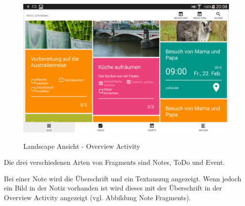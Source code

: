 \begin{figure}[H]
\centering
\begin{minipage}[t]{1\textwidth} %
\caption{Landscape Ansicht - Overview Activity} %
\includegraphics[width=1\textwidth]{img/Landscape}\\ %
\end{minipage}
\end{figure}

Die drei verschiedenen Arten von Fragments sind Notes, ToDo und Event.

Bei einer Note wird die Überschrift und ein Textauszug angezeigt. Wenn jedoch ein Bild in der Notiz vorhanden ist wird dieses mit der Überschrift in der Overview Activity angezeigt (vgl. Abbildung Note Fragments).

